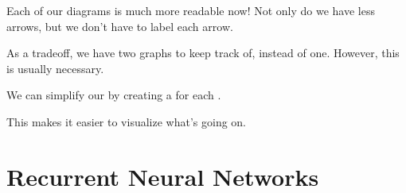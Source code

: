             Each of our diagrams is much more readable now! Not only do we have less arrows, but we don't have to label each arrow.
            
            As a tradeoff, we have two graphs to keep track of, instead of one. However, this is usually necessary.
                \\
                
            \begin{concept}
                We can simplify our  by creating a  for each .
                
                This makes it easier to visualize what's going on.
            \end{concept}
            
\section{Recurrent Neural Networks}    
            
            
        
        
        
        







